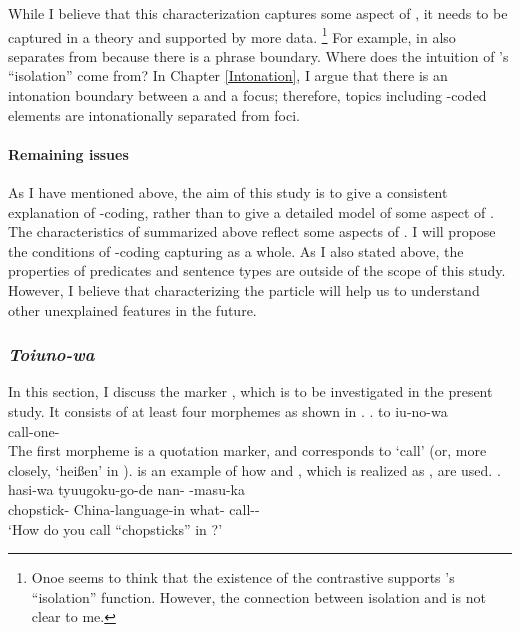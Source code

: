 While I believe that this characterization captures
some aspect of ,
it needs to be captured in a theory and supported by more data.%
 \footnote{
 Onoe seems to think that the existence of the contrastive 
 supports 's ``isolation'' function.
 However, the connection between isolation and  is not clear to me.
 }
For example,
 in \Last[a] also separates  from  because
there is a phrase boundary.
Where does the intuition of 's ``isolation'' come from?
In Chapter \ref{Intonation},
I argue that there is an intonation boundary between a  and a focus;
therefore, topics including -coded elements are intonationally separated from foci.


\paragraph{Remaining issues}

As I have mentioned above,
the aim of this study is to give a consistent explanation of -coding,
rather than to give a detailed model of some aspect of .
The characteristics of  summarized above reflect some aspects of .
I will propose the conditions of -coding capturing  as a whole.
As I also stated above,
the properties of predicates and sentence types are outside of the scope of this study.
However, I believe that characterizing the particle  will help us to understand other unexplained features in the future.

\subsubsection{\textit{Toiuno-wa}}\label{Back:GeneralChar:Toiunowa}

In this section,
I discuss the marker ,
which is to be investigated in the present study.
It consists of at least four morphemes as shown in \Next.
%
\exg. to iu-no-wa \\
	 call-one- \\

The first morpheme  is a quotation marker,
and  corresponds to `call' (or, more closely, `hei{\ss}en' in ).
\Next is an example of how  and , which is realized as , are used.
%
\exg. hasi-wa tyuugoku-go-de nan- -masu-ka \\
		chopstick- China-language-in what- call-- \\
		`How do you call ``chopsticks'' in ?'
		\hfill{\cite[][p.\ 81]{masuokatakubo92}}

